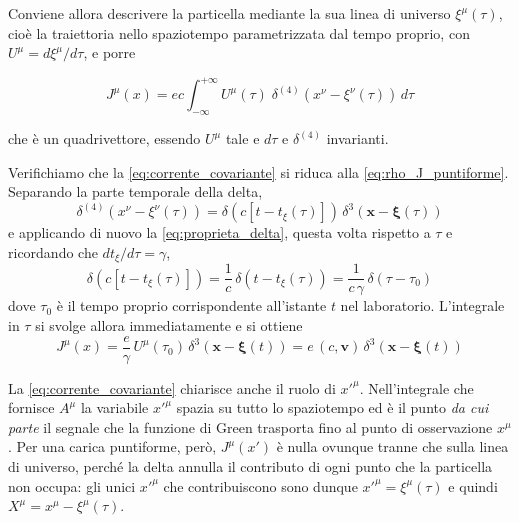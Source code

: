 Conviene allora descrivere la particella mediante la sua linea di universo $\xi^\mu(\tau)$, cioè la traiettoria nello spaziotempo parametrizzata dal tempo proprio, con $U^\mu = d\xi^\mu/d\tau$, e porre
\begin{tcolorbox}[colback=black!5!white, colframe=black!45!white, boxrule=0.8pt]
\begin{equation}
    J^\mu(x) = ec \int_{-\infty}^{+\infty} U^\mu(\tau)\;\delta^{(4)}\!\left(x^\nu - \xi^\nu(\tau)\right)\,d\tau
    \label{eq:corrente_covariante}
\end{equation}
\end{tcolorbox}
che è un quadrivettore, essendo $U^\mu$ tale e $d\tau$ e $\delta^{(4)}$ invarianti.

Verifichiamo che la \eqref{eq:corrente_covariante} si riduca alla \eqref{eq:rho_J_puntiforme}. Separando la parte temporale della delta,
\begin{equation*}
    \delta^{(4)}\!\left(x^\nu - \xi^\nu(\tau)\right) = \delta\!\left(c\left[t - t_\xi(\tau)\right]\right)\,\delta^3\!\left(\mathbf{x}-\boldsymbol{\xi}(\tau)\right)
\end{equation*}
e applicando di nuovo la \eqref{eq:proprieta_delta}, questa volta rispetto a $\tau$ e ricordando che $dt_\xi/d\tau = \gamma$,
\begin{equation*}
    \delta\!\left(c\left[t-t_\xi(\tau)\right]\right) = \frac{1}{c}\,\delta\!\left(t-t_\xi(\tau)\right) = \frac{1}{c\,\gamma}\,\delta(\tau-\tau_0)
\end{equation*}
dove $\tau_0$ è il tempo proprio corrispondente all'istante $t$ nel laboratorio. L'integrale in $\tau$ si svolge allora immediatamente e si ottiene
\begin{equation*}
    J^\mu(x) = \frac{e}{\gamma}\,U^\mu(\tau_0)\,\delta^3\!\left(\mathbf{x}-\boldsymbol{\xi}(t)\right) = e\,(c,\mathbf{v})\,\delta^3\!\left(\mathbf{x}-\boldsymbol{\xi}(t)\right)
\end{equation*}

La \eqref{eq:corrente_covariante} chiarisce anche il ruolo di $x'^\mu$. Nell'integrale che fornisce $A^\mu$ la variabile $x'^\mu$ spazia su tutto lo spaziotempo ed è il punto \emph{da cui parte} il segnale che la funzione di Green trasporta fino al punto di osservazione $x^\mu$. Per una carica puntiforme, però, $J^\mu(x')$ è nulla ovunque tranne che sulla linea di universo, perché la delta annulla il contributo di ogni punto che la particella non occupa: gli unici $x'^\mu$ che contribuiscono sono dunque $x'^\mu = \xi^\mu(\tau)$ e quindi $X^\mu = x^\mu - \xi^\mu(\tau)$.

